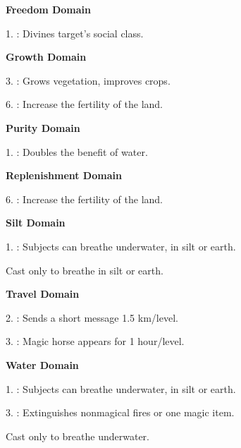 \noindent\textbf{Freedom Domain}
\begin{itemize*}
	\item[1.] : Divines target's social class.
\end{itemize*}

\noindent\textbf{Growth Domain}
\begin{itemize*}
	\item[3.] : Grows vegetation, improves crops.
	\item[6.] : Increase the fertility of the land.
\end{itemize*}

\noindent\textbf{Purity Domain}
\begin{itemize*}
	\item[1.] : Doubles the benefit of water.
\end{itemize*}

\noindent\textbf{Replenishment Domain}
\begin{itemize*}
	\item[6.] : Increase the fertility of the land.
\end{itemize*}

\noindent\textbf{Silt Domain}
\begin{itemize*}
	\item[1.] \footnotemark[1]: Subjects can breathe underwater, in silt or earth.
\end{itemize*}
 Cast only to breathe in silt or earth.

\noindent\textbf{Travel Domain}
\begin{itemize*}
	\item[2.] : Sends a short message 1.5 km/level.
	\item[3.] : Magic horse appears for 1 hour/level.
\end{itemize*}

\noindent\textbf{Water Domain}
\begin{itemize*}
	\item[1.] \footnotemark[1]: Subjects can breathe underwater, in silt or earth.
	\item[3.] : Extinguishes nonmagical fires or one magic item.
\end{itemize*}
 Cast only to breathe underwater.

